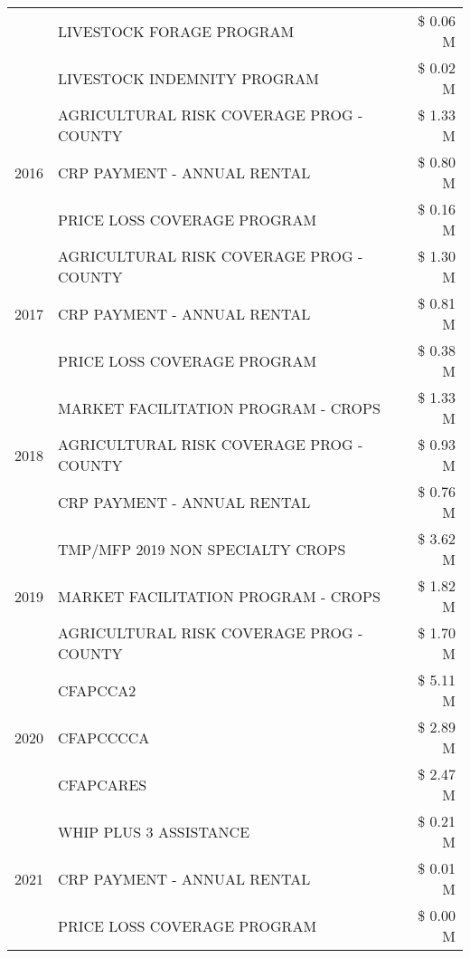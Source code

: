 \begin{tabular}{llr}
 & LIVESTOCK FORAGE PROGRAM & \$ 0.06 M \\
 & LIVESTOCK INDEMNITY PROGRAM & \$ 0.02 M \\
\cline{1-3}
\multirow[t]{3}{*}{2016} & AGRICULTURAL RISK COVERAGE PROG - COUNTY & \$ 1.33 M \\
 & CRP PAYMENT - ANNUAL RENTAL & \$ 0.80 M \\
 & PRICE LOSS COVERAGE PROGRAM & \$ 0.16 M \\
\cline{1-3}
\multirow[t]{3}{*}{2017} & AGRICULTURAL RISK COVERAGE PROG - COUNTY & \$ 1.30 M \\
 & CRP PAYMENT - ANNUAL RENTAL & \$ 0.81 M \\
 & PRICE LOSS COVERAGE PROGRAM & \$ 0.38 M \\
\cline{1-3}
\multirow[t]{3}{*}{2018} & MARKET FACILITATION PROGRAM - CROPS & \$ 1.33 M \\
 & AGRICULTURAL RISK COVERAGE PROG - COUNTY & \$ 0.93 M \\
 & CRP PAYMENT - ANNUAL RENTAL & \$ 0.76 M \\
\cline{1-3}
\multirow[t]{3}{*}{2019} & TMP/MFP 2019 NON SPECIALTY CROPS & \$ 3.62 M \\
 & MARKET FACILITATION PROGRAM - CROPS & \$ 1.82 M \\
 & AGRICULTURAL RISK COVERAGE PROG - COUNTY & \$ 1.70 M \\
\cline{1-3}
\multirow[t]{3}{*}{2020} & CFAPCCA2 & \$ 5.11 M \\
 & CFAPCCCCA & \$ 2.89 M \\
 & CFAPCARES & \$ 2.47 M \\
\cline{1-3}
\multirow[t]{3}{*}{2021} & WHIP PLUS 3 ASSISTANCE & \$ 0.21 M \\
 & CRP PAYMENT - ANNUAL RENTAL & \$ 0.01 M \\
 & PRICE LOSS COVERAGE PROGRAM & \$ 0.00 M \\
\cline{1-3}
\bottomrule
\end{tabular}
